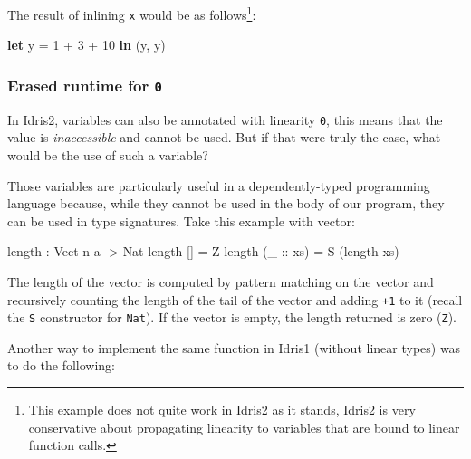 \documentclass[
]{article}
\newenvironment{Shaded}{}{}
\newcommand{\DataTypeTok}[1]{\textcolor[rgb]{0.56,0.13,0.00}{#1}}
\newcommand{\DecValTok}[1]{\textcolor[rgb]{0.25,0.63,0.44}{#1}}
\newcommand{\FunctionTok}[1]{\textcolor[rgb]{0.02,0.16,0.49}{#1}}
\newcommand{\KeywordTok}[1]{\textcolor[rgb]{0.00,0.44,0.13}{\textbf{#1}}}
\newcommand{\NormalTok}[1]{#1}
\newcommand{\OperatorTok}[1]{\textcolor[rgb]{0.40,0.40,0.40}{#1}}
\newcommand{\OtherTok}[1]{\textcolor[rgb]{0.00,0.44,0.13}{#1}}
\begin{document}
The result of inlining \texttt{x} would be as follows\footnote{This
  example does not quite work in Idris2 as it stands, Idris2 is very
  conservative about propagating linearity to variables that are bound
  to linear function calls.}:

\begin{Shaded}
\begin{Highlighting}[]
\KeywordTok{let}\NormalTok{ y }\OtherTok{=} \DecValTok{1} \OperatorTok{+} \DecValTok{3} \OperatorTok{+} \DecValTok{10} \KeywordTok{in}
\NormalTok{    (y, y)}
\end{Highlighting}
\end{Shaded}

\hypertarget{erased-runtime-for-0}{%
\subsubsection{\texorpdfstring{Erased runtime for
\texttt{0}}{Erased runtime for 0}}\label{erased-runtime-for-0}}

In Idris2, variables can also be annotated with linearity \texttt{0},
this means that the value is \emph{inaccessible} and cannot be used. But
if that were truly the case, what would be the use of such a variable?

Those variables are particularly useful in a dependently-typed
programming language because, while they cannot be used in the body of
our program, they can be used in type signatures. Take this example with
vector:

\begin{Shaded}
\begin{Highlighting}[]
\FunctionTok{length} \OperatorTok{:} \DataTypeTok{Vect}\NormalTok{ n a }\OtherTok{{-}\textgreater{}} \DataTypeTok{Nat}
\FunctionTok{length}\NormalTok{ [] }\OtherTok{=} \DataTypeTok{Z}
\FunctionTok{length}\NormalTok{ (}\OtherTok{\_ ::}\NormalTok{ xs) }\OtherTok{=} \DataTypeTok{S}\NormalTok{ (}\FunctionTok{length}\NormalTok{ xs)}
\end{Highlighting}
\end{Shaded}

The length of the vector is computed by pattern matching on the vector
and recursively counting the length of the tail of the vector and adding
\texttt{+1} to it (recall the \texttt{S} constructor for \texttt{Nat}).
If the vector is empty, the length returned is zero (\texttt{Z}).

Another way to implement the same function in Idris1 (without linear
types) was to do the following:
\end{document}
